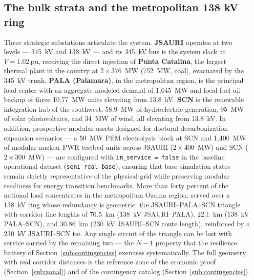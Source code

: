\subsection{The bulk strata and the metropolitan 138 kV ring}
\label{sub:strata}

Three strategic substations articulate the system. \textbf{JSAURI} operates at two levels --- 345~kV and 138~kV --- and its 345~kV bus is the system slack at $V = 1.02\ \mathrm{pu}$, receiving the direct injection of \textbf{Punta Catalina}, the largest thermal plant in the country at $2 \times 376$~MW (752~MW, coal), evacuated by the 345~kV trunk. \textbf{PALA (Palamara)}, in the metropolitan region, is the principal load center with an aggregate modeled demand of 1,645~MW and local fuel-oil backup of three 10.77~MW units elevating from 13.8~kV. \textbf{SCN} is the renewable integration hub of the southwest: 58.9~MW of hydroelectric generation, 95~MW of solar photovoltaics, and 34~MW of wind, all elevating from 13.8~kV. In addition, prospective modular assets designed for doctoral decarbonization expansion scenarios --- a 50~MW PEM electrolysis block at SCN and 1,400~MW of modular nuclear PWR testbed units across JSAURI ($2 \times 400$~MW) and SCN ($2 \times 300$~MW) --- are configured with \texttt{in\_service = false} in the baseline operational dataset (\texttt{seni\_real\_base}), ensuring that base simulation states remain strictly representative of the physical grid while preserving modular readiness for energy transition benchmarks. More than forty percent of the national load concentrates in the metropolitan Ozama region, served over a 138~kV ring whose redundancy is geometric: the JSAURI--PALA--SCN triangle with corridor line lengths of 70.5~km (138~kV JSAURI--PALA), 22.1~km (138~kV PALA--SCN), and 30.86~km (230~kV JSAURI--SCN route length), reinforced by a 230~kV JSAURI--SCN tie. Any single circuit of the triangle can be lost with service carried by the remaining two --- the $N-1$ property that the resilience battery of Section~\ref{sub:contingencies} exercises systematically. The full geometry with real corridor distances is the reference zone of the economic proof (Section~\ref{sub:zonal}) and of the contingency catalog (Section~\ref{sub:contingencies}).

